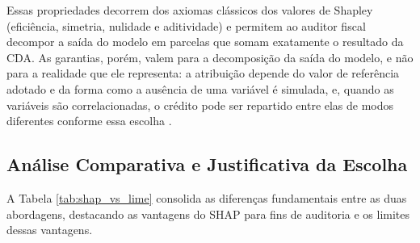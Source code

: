 Essas propriedades decorrem dos axiomas clássicos dos valores de Shapley (eficiência, simetria, nulidade e aditividade) e permitem ao auditor fiscal decompor a saída do modelo em parcelas que somam exatamente o resultado da CDA. As garantias, porém, valem para a decomposição da saída do modelo, e não para a realidade que ele representa: a atribuição depende do valor de referência adotado e da forma como a ausência de uma variável é simulada, e, quando as variáveis são correlacionadas, o crédito pode ser repartido entre elas de modos diferentes conforme essa escolha \cite{molnarInterpretableMachineLearning}.

\subsection{Análise Comparativa e Justificativa da Escolha}
\label{subsec:comparacao_xai}

A Tabela \ref{tab:shap_vs_lime} consolida as diferenças fundamentais entre as duas abordagens, destacando as vantagens do SHAP para fins de auditoria e os limites dessas vantagens.

